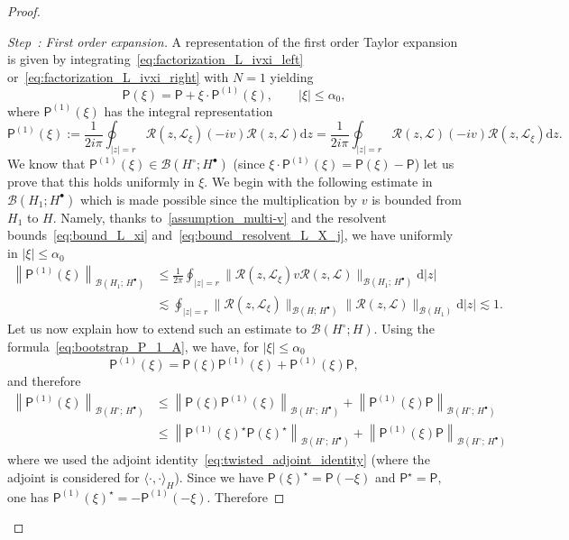 \documentclass[AHL,Unicode,longabstracts,published]{cedram}
\renewcommand{\d}{\mathrm{d}}
\newcommand{\LL}{\mathcal{L}}
\newcommand{\PP}{\mathsf{P}}
\newcommand{\RR}{\mathcal{R}}
\newcommand{\BBB}{\mathscr{B}}
\newcommand{\Ss}{H}
\newcommand{\Ssp}{H^{\bullet}}
\newcommand{\Ssm}{H^{\circ}}
\renewcommand*\le{\leqslant}
\newcommand{\la}{\langle}
\newcommand{\ra}{\rangle}
\newcounter{stepcount}
\newenvironment{step}[1]{\refstepcounter{stepcount}\begin{proof}[Step~\thestepcount: #1]}{\let\qed\relax\end{proof}}
\begin{document}
\begin{proof}
\setcounter{stepcount}{0}
\begin{step}{{First order expansion}}\label{prflemm3.4stp1}
A representation of the first order Taylor expansion is given by integrating~\eqref{eq:factorization_L_ivxi_left} or~\eqref{eq:factorization_L_ivxi_right} with $N = 1$ yielding
\[
\PP(\xi) = \PP + \xi \cdot \PP^{(1)}(\xi), \qquad | \xi | \le \alpha_0,
\]
where $\PP^{(1)}(\xi)$ has the integral representation
\[
\PP^{(1)}(\xi) := \frac{1}{2 i \pi} \oint_{|z| = r} \RR(z,\LL_{\xi}) (- i v) \RR(z,\LL) \d z = \frac{1}{2 i \pi} \oint_{|z| = r} \RR(z,\LL) (- i v) \RR(z,\LL_{\xi}) \d z.
\]
We know that $\PP^{(1)}(\xi) \in \BBB(\Ssm ; \Ssp)$ (since $\xi\cdot \PP^{(1)}(\xi)=\PP(\xi)-\PP$) let us prove that this holds uniformly in $\xi$. We begin with the following estimate in $\BBB(\Ss_{1};\Ssp)$ which is made possible since the multiplication by $v$ is bounded from $\Ss_{1}$ to $\Ss$. Namely, thanks to~\eqref{assumption_multi-v} and the resolvent bounds~\eqref{eq:bound_L_xi} and~\eqref{eq:bound_resolvent_L_X_j}, we have uniformly in $|\xi| \le \alpha_0$
\begin{equation}\label{eq:bound_PP1_H1X*}
\begin{split}
\left\| \PP^{(1)}(\xi) \right\|_{\BBB(\Ss_{1} ;\,\Ssp)} & \le \frac{1}{2 \pi} \oint_{|z|=r} \| \RR(z,\LL_{\xi}) v \RR(z,\LL) \|_{\BBB(\Ss_{1} ;\,\Ssp) } \d |z| \\
& \lesssim \oint_{|z|=r} \| \RR(z,\LL_{\xi}) \|_{\BBB(\Ss ;\,\Ssp) } \| \RR(z,\LL) \|_{\BBB(\Ss_{1})} \d |z|\lesssim 1.
\end{split}
\end{equation}
Let us now explain how to extend such an estimate to $\BBB(\Ssm;\Ss)$. Using the formula~\eqref{eq:bootstrap_P_1_A}, we have, for $|\xi| \le \alpha_0$
\[
\PP^{(1)}(\xi) = \PP(\xi) \PP^{(1)}(\xi) + \PP^{(1)}(\xi) \PP,
\]
and therefore
\begin{align*}
\left\| \PP^{(1)}(\xi) \right\|_{\BBB(\Ssm ;\,\Ssp)} & \le \left\| \PP(\xi) \PP^{(1)}(\xi) \right\|_{\BBB(\Ssm ;\,\Ssp)} + \left\| \PP^{(1)}(\xi) \PP \right\|_{\BBB(\Ssm ;\,\Ssp)}\\
& \le \left\| \PP^{(1)}(\xi)^{\star} \PP(\xi)^{\star} \right\|_{\BBB(\Ssm ;\,\Ssp)} + \left\| \PP^{(1)}(\xi) \PP \right\|_{\BBB(\Ssm ;\,\Ssp)}
\end{align*}
where we used the adjoint identity~\eqref{eq:twisted_adjoint_identity} (where the adjoint is considered for $\la \cdot, \cdot \ra_{\Ss}$). Since we have $\PP(\xi)^\star = \PP(-\xi)$ and $\PP^\star = \PP,$ one has $\PP^{(1)}(\xi)^{\star}=-\PP^{(1)}(-\xi)$. Therefore

\end{step}
\end{proof}
\end{document}
